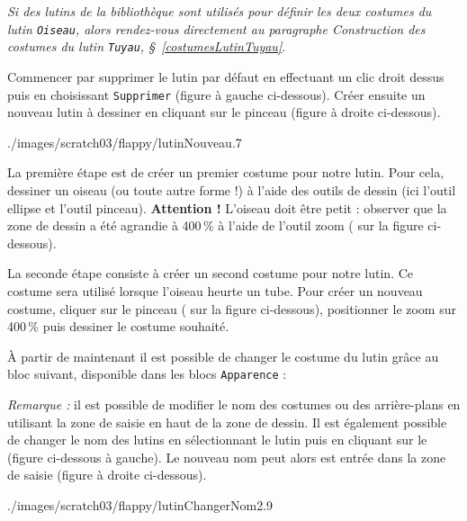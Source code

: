 \emph{Si des lutins de la bibliothèque sont utilisés pour définir les deux costumes du lutin \texttt{Oiseau}, alors rendez-vous directement au paragraphe \emph{Construction des costumes du lutin \texttt{Tuyau}}, \S\ \vref{costumesLutinTuyau}}.

\vspace{6pt}

Commencer par supprimer le lutin par défaut en effectuant un clic droit dessus puis en choisissant \texttt{Supprimer} (figure à gauche ci-dessous). Créer ensuite un nouveau lutin à dessiner en cliquant sur le pinceau (figure à droite ci-dessous).

%
	      {./images/scratch03/flappy/lutinNouveau}{.7\textwidth}

La première étape est de créer un premier costume pour notre lutin. Pour cela, dessiner un oiseau (ou toute autre forme !) à l'aide des outils de dessin (ici l'outil ellipse et l'outil pinceau). \textbf{Attention !} L'oiseau doit être petit : observer que la zone de dessin a été agrandie à 400\,\% à l'aide de l'outil zoom ( sur la figure ci-dessous).





La seconde étape consiste à créer un second costume pour notre lutin. Ce costume sera utilisé lorsque l'oiseau heurte un tube. Pour créer un nouveau costume, cliquer sur le pinceau ( sur la figure ci-dessous), positionner le zoom sur 400\,\% puis dessiner le costume souhaité. 



À partir de maintenant il est possible de changer le costume du lutin grâce au bloc suivant, disponible dans les blocs \texttt{Apparence} :



\emph{Remarque :} il est possible de modifier le nom des costumes ou des arrière-plans en utilisant la zone de saisie en haut de la zone de dessin. Il est également possible de changer le nom des lutins en sélectionnant le lutin puis en cliquant sur le  (figure ci-dessous à gauche). Le nouveau nom peut alors est entrée dans la zone de saisie (figure à droite ci-dessous).

%
	      {./images/scratch03/flappy/lutinChangerNom2}{.9\textwidth}


